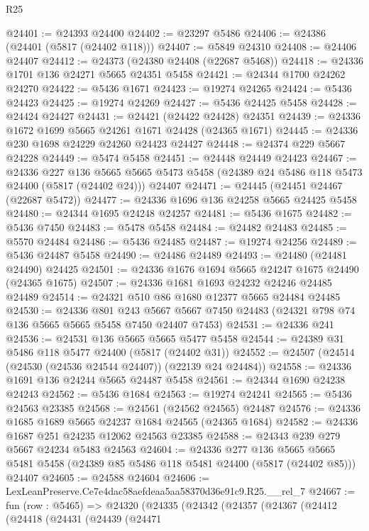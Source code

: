\begin{lexlean}{R25}
\begin{coremodule}
@24401 := @24393 @24400
@24402 := @23297 @5486
@24406 := @24386 (@24401 (@5817 (@24402 @118)))
@24407 := @5849 @24310
@24408 := @24406 @24407
@24412 := @24373 (@24380 @24408 (@22687 @5468))
@24418 := @24336 @1701 @136 @24271 @5665 @24351 @5458
@24421 := @24344 @1700 @24262 @24270
@24422 := @5436 @1671
@24423 := @19274 @24265
@24424 := @5436 @24423
@24425 := @19274 @24269
@24427 := @5436 @24425 @5458
@24428 := @24424 @24427
@24431 := @24421 (@24422 @24428) @24351
@24439 := @24336 @1672 @1699 @5665 @24261 @1671 @24428 (@24365 @1671)
@24445 := @24336 @230 @1698 @24229 @24260 @24423 @24427
@24448 := @24374 @229 @5667 @24228
@24449 := @5474 @5458
@24451 := @24448 @24449 @24423
@24467 := @24336
    @227
    @136
    @5665
    @5665
    @5473
    @5458
    (@24389 @24 @5486 @118 @5473 @24400 (@5817 (@24402 @24)))
    @24407
@24471 := @24445 (@24451 @24467 (@22687 @5472))
@24477 := @24336 @1696 @136 @24258 @5665 @24425 @5458
@24480 := @24344 @1695 @24248 @24257
@24481 := @5436 @1675
@24482 := @5436 @7450
@24483 := @5478 @5458
@24484 := @24482 @24483
@24485 := @5570 @24484
@24486 := @5436 @24485
@24487 := @19274 @24256
@24489 := @5436 @24487 @5458
@24490 := @24486 @24489
@24493 := @24480 (@24481 @24490) @24425
@24501 := @24336 @1676 @1694 @5665 @24247 @1675 @24490 (@24365 @1675)
@24507 := @24336 @1681 @1693 @24232 @24246 @24485 @24489
@24514 := @24321 @510 @86 @1680 @12377 @5665 @24484 @24485
@24530 := @24336
    @801
    @243
    @5667
    @5667
    @7450
    @24483
    (@24321 @798 @74 @136 @5665 @5665 @5458 @7450 @24407 @7453)
@24531 := @24336 @241
@24536 := @24531 @136 @5665 @5665 @5477 @5458
@24544 := @24389 @31 @5486 @118 @5477 @24400 (@5817 (@24402 @31))
@24552 := @24507 (@24514 (@24530 (@24536 @24544 @24407)) (@22139 @24 @24484))
@24558 := @24336 @1691 @136 @24244 @5665 @24487 @5458
@24561 := @24344 @1690 @24238 @24243
@24562 := @5436 @1684
@24563 := @19274 @24241
@24565 := @5436 @24563 @23385
@24568 := @24561 (@24562 @24565) @24487
@24576 := @24336 @1685 @1689 @5665 @24237 @1684 @24565 (@24365 @1684)
@24582 := @24336 @1687 @251 @24235 @12062 @24563 @23385
@24588 := @24343 @239 @279 @5667 @24234 @5483 @24563
@24604 := @24336
    @277
    @136
    @5665
    @5665
    @5481
    @5458
    (@24389 @85 @5486 @118 @5481 @24400 (@5817 (@24402 @85)))
    @24407
@24605 := @24588 @24604
@24606 := LexLeanPreserve.Ce7e4dac58aefdeaa5aa58370d36e91c9.R25.__rel_7
@24667 := fun (row : @5465) =>
  @24320
    (@24335
      (@24342
        (@24357
          (@24367
            (@24412
              (@24418
                (@24431
                  (@24439
                    (@24471

\end{coremodule}
\end{lexlean}
